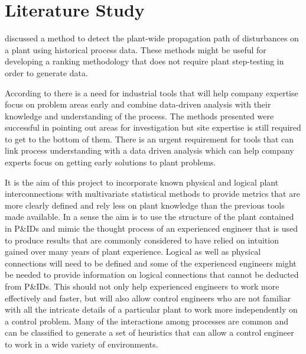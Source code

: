 \section{Literature Study}





\citet{Bauer2005} discussed a method to detect the plant-wide propagation path of disturbances on a plant using historical process data.
These methods might be useful for developing a ranking methodology that does not require plant step-testing in order to generate data.


According to \citet{Bauer2005} there is a need for industrial tools that will help company expertise focus on problem areas early and combine data-driven analysis with their knowledge and understanding of the process.
The methods presented were successful in pointing out areas for investigation but site expertise is still required to get to the bottom of them.
There is an urgent requirement for tools that can link process understanding with a data driven analysis which can help company experts focus on getting early solutions to plant problems.

It is the aim of this project to incorporate known physical and logical plant interconnections with multivariate statistical methods to provide metrics that are more clearly defined and rely less on plant knowledge than the previous tools made available.
In a sense the aim is to use the structure of the plant contained in P\&IDs and mimic the thought process of an experienced engineer that is used to produce results that are commonly considered to have relied on intuition gained over many years of plant experience.
Logical as well as physical connections will need to be defined and some of the experienced engineers might be needed to provide information on logical connections that cannot be deducted from P\&IDs.
This should not only help experienced engineers to work more effectively and faster, but will also allow control engineers who are not familiar with all the intricate details of a particular plant to work more independently on a control problem.
Many of the interactions among processes are common and can be classified to generate a set of heuristics that can allow a control engineer to work in a wide variety of environments.


